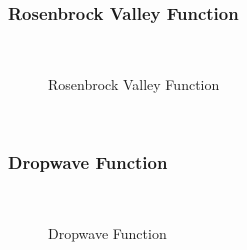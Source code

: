 \subsubsection{Rosenbrock Valley Function}
~
\begin{figure}[ht]
	\centering
	\setlength \fboxsep{0pt}
	\setlength \fboxrule{0.5pt}
	\caption{Rosenbrock Valley Function}
	\label{fig:Rosenbrock}
\end{figure}
~
\subsubsection{Dropwave Function}
~
\begin{figure}[ht]
	\centering
	\setlength \fboxsep{0pt}
	\setlength \fboxrule{0.5pt}
	\caption{Dropwave Function}
	\label{fig:DropwaveGraph}
\end{figure}
~
